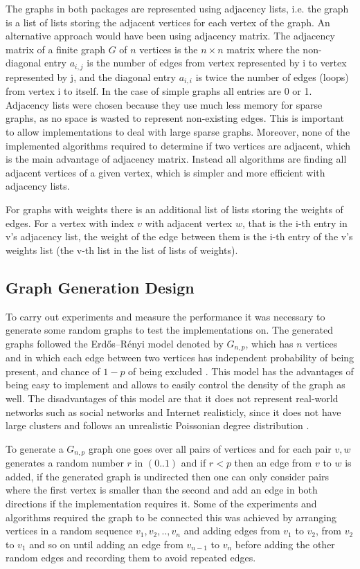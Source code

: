 \documentclass{report}
\theoremstyle{plain}
\theoremstyle{definition}
\theoremstyle{remark}
\begin{document}
The graphs in both packages are represented using adjacency lists, i.e. the graph is a list of lists storing the adjacent vertices for each vertex of the graph. An alternative approach would have been using adjacency matrix. The adjacency matrix of a finite graph $G$ of $n$ vertices is the $n\times n$ matrix where the non-diagonal entry $a_{i,j}$ is the number of edges from vertex represented by i to vertex represented by j, and the diagonal entry $a_{i,i}$ is twice the number of edges (loops) from vertex i to itself. In the case of simple graphs all entries are 0 or 1. Adjacency lists were chosen because they use much less memory for sparse graphs,  as no space is wasted to represent non-existing edges. This is important to allow implementations to deal with large sparse graphs. Moreover, none of the implemented algorithms required to determine if two vertices are adjacent, which is the main advantage of adjacency matrix. Instead all algorithms are finding all adjacent vertices of a given vertex, which is simpler and more efficient with adjacency lists.

For graphs with weights there is an additional list of lists storing the weights of edges. For a vertex with index $v$ with adjacent vertex $w$, that is the i-th entry in v's adjacency list, the weight of the edge between them is the i-th entry of the v's weights list (the v-th list in the list of lists of weights).

\subsection{Graph Generation Design}

To carry out experiments and measure the performance it was necessary to generate some random graphs to test the implementations on. The generated graphs followed the Erdős–Rényi model denoted by $G_{n,p}$, which has $n$ vertices and in which each edge between two vertices has independent probability of being present, and chance of $1-p$ of being excluded \cite{newman20062}. This model has the advantages of being easy to implement and allows to easily control the density of the graph as well. The disadvantages of this model are that it does not represent real-world networks such as social networks and Internet realisticly, since it does not have large clusters and follows an unrealistic Poissonian degree distribution \cite{newman20062}.

To generate a $G_{n,p}$ graph one goes over all pairs of vertices and for each pair $v,w$ generates a random number $r$ in $(0..1)$ and if $r < p$ then an edge from $v$ to $w$ is added, if the generated graph is undirected then one can only consider pairs where the first vertex is smaller than the second and add an edge in both directions if the implementation requires it. Some of the experiments and algorithms required the graph to be connected this was achieved by arranging vertices in a random sequence $v_1,v_2,..,v_n$ and adding edges from $v_1$ to $v_2$, from $v_2$ to $v_1$ and so on until adding an edge from $v_{n-1}$ to $v_n$  before adding the other random edges and recording them to avoid repeated edges.
\end{document}

